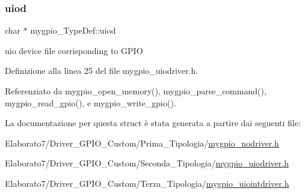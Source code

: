 \subsubsection{\texorpdfstring{uiod}{uiod}}
{\footnotesize\ttfamily char $\ast$ mygpio\+\_\+\+Type\+Def\+::uiod}

uio device file corrisponding to G\+P\+IO 

Definizione alla linea 25 del file mygpio\+\_\+uiodriver.\+h.



Referenziato da mygpio\+\_\+open\+\_\+memory(), mygpio\+\_\+parse\+\_\+command(), mygpio\+\_\+read\+\_\+gpio(), e mygpio\+\_\+write\+\_\+gpio().



La documentazione per questa struct è stata generata a partire dai seguenti file\+:\begin{DoxyCompactItemize}
\item 
Elaborato7/\+Driver\+\_\+\+G\+P\+I\+O\+\_\+\+Custom/\+Prima\+\_\+\+Tipologia/\hyperlink{mygpio__nodriver_8h}{mygpio\+\_\+nodriver.\+h}\item 
Elaborato7/\+Driver\+\_\+\+G\+P\+I\+O\+\_\+\+Custom/\+Seconda\+\_\+\+Tipologia/\hyperlink{mygpio__uiodriver_8h}{mygpio\+\_\+uiodriver.\+h}\item 
Elaborato7/\+Driver\+\_\+\+G\+P\+I\+O\+\_\+\+Custom/\+Terza\+\_\+\+Tipologia/\hyperlink{mygpio__uiointdriver_8h}{mygpio\+\_\+uiointdriver.\+h}\end{DoxyCompactItemize}
